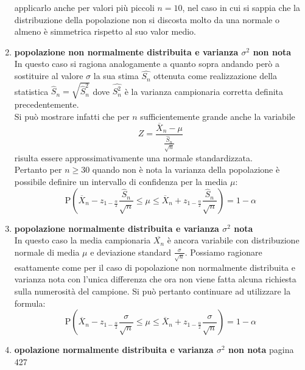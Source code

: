 \documentclass[a4paper,12pt, oneside]{book}
\begin{document}
\begin{enumerate}
  applicarlo anche per valori più piccoli $n=10$, nel caso in cui si sappia che la
distribuzione della popolazione non si discosta molto da una normale o almeno è
simmetrica rispetto al suo valor medio.
\item \textbf{popolazione non normalmente distribuita e varianza $\sigma^2$ non nota}\\
  In questo caso si ragiona analogamente a quanto sopra andando però a sostituire
  al valore $\sigma$ la sua stima $\hat{S_n}$ ottenuta come realizzazione della statistica $\hat{S}_{n}=\sqrt{\hat{S}_{n}^{2}}$ dove $\hat{S_n^2}$ è la varianza campionaria corretta definita precedentemente.\\
  Si può mostrare infatti che per $n$ sufficientemente grande anche la variabile
  \[Z=\frac{\overline{X}_{n}-\mu}{\frac{\hat{S}_{n}}{\sqrt{n}}}\]
  risulta essere approssimativamente una normale standardizzata.\\
  Pertanto per $n\geq 30$ quando non è nota la varianza della popolazione è possibile
  definire un intervallo di confidenza per la media $\mu$:
  \[\mathrm{P}\left(\overline{X}_{n}-z_{1-\frac{\alpha}{2}} \frac{\hat{S}_{n}}{\sqrt{n}} \leq \mu \leq \overline{X}_{n}+z_{1-\frac{\alpha}{2}} \frac{\hat{S}_{n}}{\sqrt{n}}\right)=1-\alpha\]
\item \textbf{popolazione normalmente distribuita e varianza $\sigma^2$ nota}
  \\In questo caso la media campionaria $\overline{X_n}$ è ancora variabile con distribuzione normale di media $\mu$ e deviazione standard $\frac{\sigma}{\sqrt{n}}$. Possiamo ragionare esattamente come per il caso di popolazione non normalmente
distribuita e varianza nota con l’unica differenza che ora non viene fatta alcuna
richiesta sulla numerosità del campione.
Si può pertanto continuare ad utilizzare la formula:
\[\mathrm{P}\left(\overline{X}_{n}-z_{1-\frac{\alpha}{2}} \frac{\sigma}{\sqrt{n}} \leq \mu \leq \overline{X}_{n}+z_{1 -\frac{\alpha}{2}} \frac{\sigma}{\sqrt{n}}\right)=1-\alpha\]
\item \textbf{opolazione normalmente distribuita e varianza $\sigma^2$ non nota}
  pagina 427
\end{enumerate}
\end{document}
